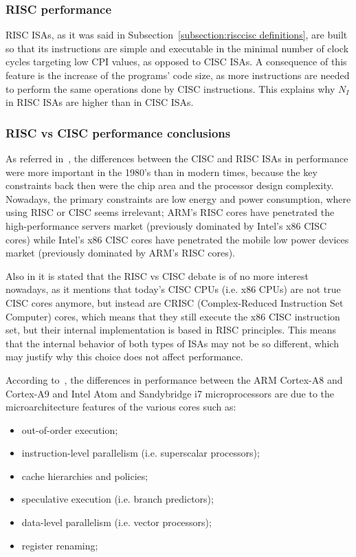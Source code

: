 \subsubsection{RISC performance}
RISC ISAs, as it was said in Subsection~\ref{subsection:risccisc definitions},
are built so that its instructions are simple and executable in the minimal
number of clock cycles targeting low CPI values, as opposed to CISC ISAs. A
consequence of this feature is the increase of the programs' code size, as more
instructions are needed to perform the same operations done by CISC
instructions. This explains why $N_I$ in RISC ISAs are higher than in CISC ISAs.

\subsubsection{RISC vs CISC performance conclusions}
As referred in~\cite{bib:ciscriscirrelevant}, the differences between the CISC
and RISC ISAs in performance were more important in the 1980's than in modern
times, because the key constraints back then were the chip area and the
processor design complexity. Nowadays, the primary constraints are low energy
and power consumption, where using RISC or CISC seems irrelevant; ARM's RISC
cores have penetrated the high-performance servers market (previously dominated
by Intel's x86 CISC cores) while Intel's x86 CISC cores have penetrated the mobile
low power devices market (previously dominated by ARM's RISC cores).

Also in \cite{bib:crisc} it is stated that the RISC vs CISC debate is of no more
interest nowadays, as it mentions that today's CISC CPUs (i.e. x86 CPUs) are not
true CISC cores anymore, but instead are CRISC (Complex-Reduced Instruction Set
Computer) cores, which means that they still execute the x86 CISC instruction
set, but their internal implementation is based in RISC principles. This means
that the internal behavior of both types of ISAs may not be so different, which
may justify why this choice does not affect performance.

According to~\cite{bib:ciscriscirrelevant}, the differences in performance
between the ARM Cortex-A8 and Cortex-A9 and Intel Atom and Sandybridge i7
microprocessors are due to the microarchitecture features of the various cores
such as:

\begin{itemize}
\item out-of-order execution;
\item instruction-level parallelism (i.e. superscalar processors); 
\item cache hierarchies and policies;
\item speculative execution (i.e. branch predictors);
\item data-level parallelism (i.e. vector processors);
\item register renaming;
\end{itemize}

